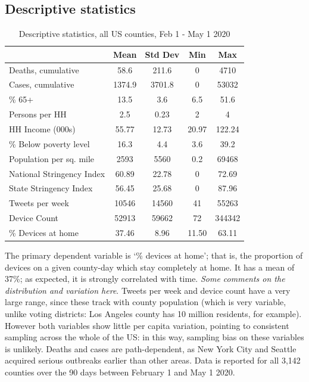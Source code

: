 \documentclass{article}
\begin{document}
\subsection{Descriptive statistics}\label{descrip}
\begin{singlespace}
    \begin{table}[!htb]
    \centering  
  \caption{Descriptive statistics, all US counties, Feb 1 - May 1 2020}
  \begin{tabular}{lcccc}
    \toprule
     & Mean & Std Dev & Min & Max\\
    \midrule
    Deaths, cumulative & 58.6 & 211.6 & 0 & 4710\\
    Cases, cumulative & 1374.9 & 3701.8 & 0 & 53032\\
    \addlinespace
    \% 65+ & 13.5 & 3.6 & 6.5 & 51.6\\
    Persons per HH & 2.5 & 0.23 & 2 & 4\\
    HH Income (000s) & 55.77 & 12.73 & 20.97 & 122.24\\
    \% Below poverty level & 16.3 & 4.4 & 3.6 & 39.2\\
    Population per sq. mile & 2593 & 5560 & 0.2 & 69468\\
    \addlinespace
    National Stringency Index & 60.89 & 22.78 & 0 & 72.69\\
    State Stringency Index & 56.45 & 25.68 & 0 & 87.96\\
    \addlinespace
    Tweets per week & 10546 & 14560 & 41 & 55263\\
    \addlinespace
    Device Count & 52913 & 59662 & 72 & 344342\\
    \% Devices at home & 37.46 & 8.96 & 11.50 & 63.11\\
    \bottomrule
    \end{tabular}
  \end{table}
\end{singlespace}
The primary dependent variable is `\% devices at home'; that is, the proportion of devices on a given county-day which stay completely at home. It has a mean of 37\%; as expected, it is strongly correlated with time. \textit{Some comments on the distribution and variation here}. Tweets per week and device count have a very large range, since these track with county population (which is very variable, unlike voting districts: Los Angeles county has 10 million residents, for example). However both variables show little per capita variation, pointing to consistent sampling across the whole of the US: in this way, sampling bias on these variables is unlikely. Deaths and cases are path-dependent, as New York City and Seattle acquired serious outbreaks earlier than other areas. Data is reported for all 3,142 counties over the 90 days between February 1 and May 1 2020.
\end{document}
